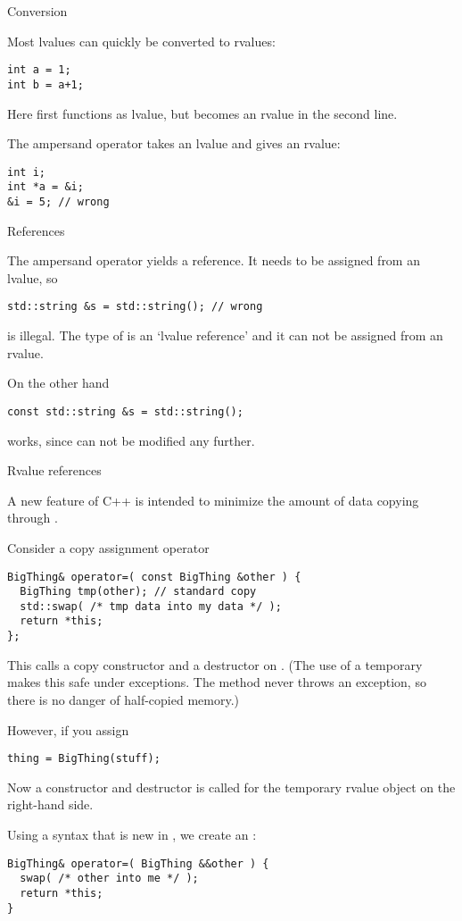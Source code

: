  {Conversion}

Most lvalues can quickly be converted to rvalues:
\begin{verbatim}
int a = 1;
int b = a+1;
\end{verbatim}
Here  first functions as lvalue, but becomes an rvalue in the
second line.

The ampersand operator takes an lvalue and gives an rvalue:
\begin{verbatim}
int i;
int *a = &i;
&i = 5; // wrong
\end{verbatim}

 {References}

The ampersand operator yields a reference. It needs to be assigned
from an lvalue, so
\begin{verbatim}
std::string &s = std::string(); // wrong
\end{verbatim}
is illegal. The type of  is an `lvalue reference' and it can not
be assigned from an rvalue.

On the other hand
\begin{verbatim}
const std::string &s = std::string();
\end{verbatim}
works, since  can not be modified any further.

 {Rvalue references}
\label{sec:rvalue-ref}

A new feature of C++ is
intended to minimize the amount of data copying through
.

Consider a copy assignment operator
\begin{verbatim}
BigThing& operator=( const BigThing &other ) {
  BigThing tmp(other); // standard copy
  std::swap( /* tmp data into my data */ );
  return *this;
};
\end{verbatim}
This calls a copy constructor and a destructor on . (The use of
a temporary makes this safe under exceptions. The 
method never throws an exception, so there is no danger of half-copied
memory.)

However, if you assign
\begin{verbatim}
thing = BigThing(stuff);
\end{verbatim}
Now a constructor and destructor is called for the temporary rvalue object on
the right-hand side.

Using a syntax that is new in , we create an
:
\begin{verbatim}
BigThing& operator=( BigThing &&other ) {
  swap( /* other into me */ );
  return *this;
}
\end{verbatim}


